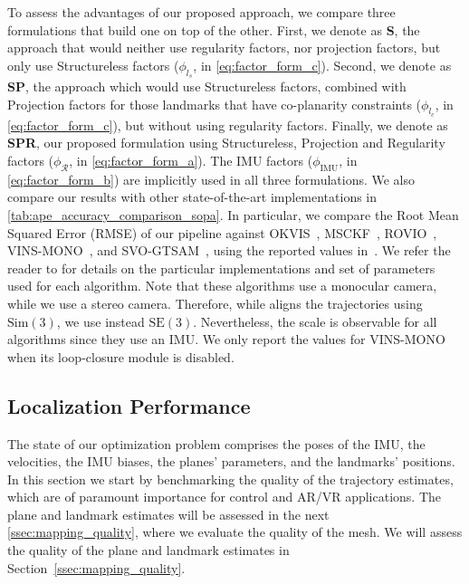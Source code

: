 To assess the advantages of our proposed approach, we compare three formulations that build one on top of the other.
First, we denote as \textbf{S}, the approach that would neither use regularity factors, nor projection factors, but only use Structureless factors ($\phi_{l_s}$, in \cref{eq:factor_form_c}).
Second, we denote as \textbf{SP}, the approach which would use Structureless factors, combined with Projection factors for those landmarks that have co-planarity constraints ($\phi_{l_c}$, in \cref{eq:factor_form_c}), but without using regularity factors.
Finally, we denote as \textbf{SPR}, our proposed formulation using Structureless, Projection and Regularity factors ($\phi_{\mathcal{R}}$, in \cref{eq:factor_form_a}).
The IMU factors ($\phi_{\text{IMU}}$, in \cref{eq:factor_form_b}) are implicitly used in all three formulations.
We also compare our results with other state-of-the-art implementations in \cref{tab:ape_accuracy_comparison_sopa}.
In particular, we compare the Root Mean Squared Error (RMSE) of our pipeline against OKVIS~\cite{Leutenegger13rss}, MSCKF~\cite{Mourikis07icra},
 ROVIO~\cite{Blosch15iros}, VINS-MONO~\cite{Qin17arxiv}, and SVO-GTSAM~\cite{Forster17troOnmanifold}, using the reported values in~\cite{Delmerico18benchmark}.
We refer the reader to \cite{Delmerico18benchmark} for details on the particular implementations and set of parameters used for each algorithm.
Note that these algorithms use a monocular camera, while we use a stereo camera.
Therefore, while \cite{Delmerico18benchmark} aligns the trajectories using $\mathrm{Sim}(3)$, we use instead $\mathrm{SE}(3)$.
Nevertheless, the scale is observable for all algorithms since they use an IMU.
We only report the values for VINS-MONO when its loop-closure module is disabled.

\subsection{Localization Performance}
\label{ssec:state_estimation}

The state of our optimization problem comprises the poses of the IMU, the velocities, the IMU biases, the planes' parameters, and the landmarks' positions.
In this section we start by benchmarking the quality of the trajectory estimates, which are of paramount importance for control and AR/VR applications.
 The plane and landmark estimates will be assessed in the next \cref{ssec:mapping_quality}, where we evaluate the quality of the mesh.
We will assess the quality of the plane and landmark estimates in Section~\ref{ssec:mapping_quality}.

